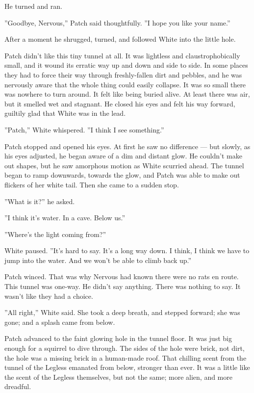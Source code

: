 \documentclass[12pt]{book}
\begin{document}
He turned and ran.

''Goodbye, Nervous,'' Patch said thoughtfully. ''I hope you like your name.''

After a moment he shrugged, turned, and followed White into the little hole.

Patch didn't like this tiny tunnel at all. It was lightless and claustrophobically small, and it wound its erratic way up and down and side to side. In some places they had to force their way through freshly-fallen dirt and pebbles, and he was nervously aware that the whole thing could easily collapse. It was so small there was nowhere to turn around. It felt like being buried alive. At least there was air, but it smelled wet and stagnant. He closed his eyes and felt his way forward, guiltily glad that White was in the lead.

''Patch,'' White whispered. ''I think I see something.''

Patch stopped and opened his eyes. At first he saw no difference ---
but slowly, as his eyes adjusted, he began aware of a dim and distant glow. He couldn't make out shapes, but he saw amorphous motion as White scurried ahead. The tunnel began to ramp downwards, towards the glow, and Patch was able to make out flickers of her white tail. Then she came to a sudden stop.

''What is it?'' he asked.

''I think it's water. In a cave. Below us.''

''Where's the light coming from?''

White paused. ''It's hard to say. It's a long way down. I think, I think we have to jump into the water. And we won't be able to climb back up.''

Patch winced. That was why Nervous had known there were no rats en route. This tunnel was one-way. He didn't say anything. There was nothing to say. It wasn't like they had a choice.

''All right,'' White said. She took a deep breath, and stepped forward; she was gone; and a splash came from below.

Patch advanced to the faint glowing hole in the tunnel floor. It was just big enough for a squirrel to dive through. The sides of the hole were brick, not dirt, the hole was a missing brick in a human-made roof. That chilling scent from the tunnel of the Legless emanated from below, stronger than ever. It was a little like the scent of the Legless themselves, but not the same; more alien, and more dreadful.
\end{document}

